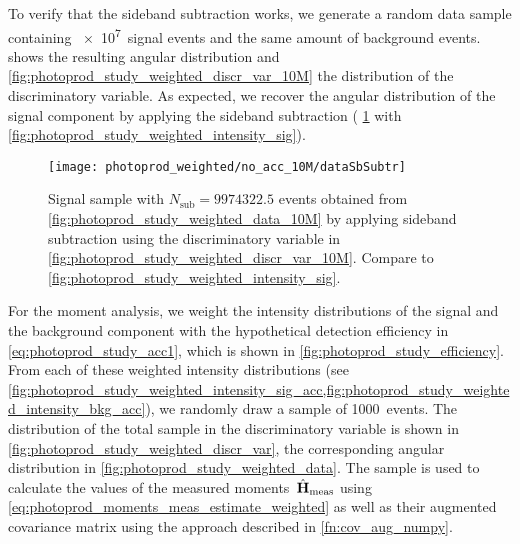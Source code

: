 To verify that the sideband subtraction works, we generate a random
data sample containing \num{e7}~signal events and the same amount of
background events.   shows
the resulting angular distribution and
\cref{fig:photoprod_study_weighted_discr_var_10M}  the distribution of
the discriminatory variable.  As expected, we recover the angular
distribution of the signal component by applying the sideband
subtraction (\confer
\cref{fig:photoprod_study_weighted_data_sb_subtr_10M} with
\cref{fig:photoprod_study_weighted_intensity_sig}).

\begin{figure}[tbp]
  \centering%
  \texttt{[image: photoprod\_weighted/no\_acc\_10M/dataSbSubtr]}%
  \caption{Signal sample with $N_\text{sub} = \num{9974322.5}$ events
  obtained from \cref{fig:photoprod_study_weighted_data_10M} by
  applying sideband subtraction using the discriminatory variable in
  \cref{fig:photoprod_study_weighted_discr_var_10M}.  Compare to
  \cref{fig:photoprod_study_weighted_intensity_sig}.}%
  \label{fig:photoprod_study_weighted_data_sb_subtr_10M}%
\end{figure}

For the moment analysis, we weight the intensity distributions of the
signal and the background component with the hypothetical detection
efficiency in \cref{eq:photoprod_study_acc1}, which is shown in
\cref{fig:photoprod_study_efficiency}.  From each of these weighted
intensity distributions (see
\cref{fig:photoprod_study_weighted_intensity_sig_acc,fig:photoprod_study_weighted_intensity_bkg_acc}),
we randomly draw a sample of \num{1000}~events.  The distribution of
the total sample in the discriminatory variable is shown in
\cref{fig:photoprod_study_weighted_discr_var}, the corresponding
angular distribution in \cref{fig:photoprod_study_weighted_data}.  The
sample is used to calculate the values of the measured
moments~$\hat{\bm{\mathrm{H}}}_\text{meas}$ using
\cref{eq:photoprod_moments_meas_estimate_weighted} as well as their
augmented covariance matrix using the approach described in
\cref{fn:cov_aug_numpy}.

